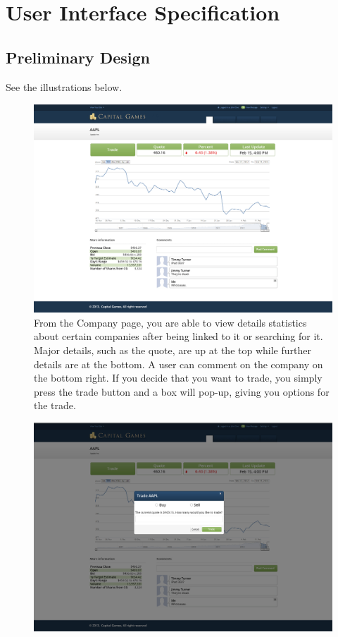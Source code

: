 \chapter{User Interface Specification}

\section{Preliminary Design}

See the illustrations below.

\begin{figure}
\centering
\includegraphics[width=5.5in]{./mockups/JPEG/company.jpg}
\caption{From the Company page, you are able to view details statistics about certain companies after being linked to it or searching for it. Major details, such as the quote, are up at the top while further details are at the bottom. A user can comment on the company on the bottom right. If you decide that you want to trade, you simply press the trade button and a box will pop-up, giving you options for the trade.}
\end{figure}

\begin{figure}
\centering
\includegraphics[width=5.5in]{./mockups/JPEG/Tradepopup.jpg}
\end{figure}



